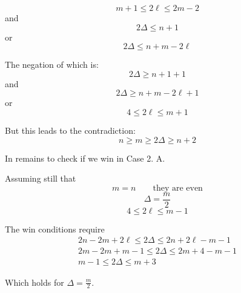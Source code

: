 \[ m+1 \leq 2 \ell \leq 2m -2 \]
and
\[2 \Delta \leq n +1 \]
or
\[2\Delta \leq n + m - 2 \ell \]

The negation of which is:
\[2 \Delta \geq n +1 +1 \]
and
\[2\Delta \geq n + m - 2 \ell + 1\]
or
\[4 \leq 2 \ell \leq m +1 \]

But this leads to the contradiction:
\[ n \geq m \geq 2 \Delta \geq n +2 \]

In remains to check if we win in Case 2. A.

Assuming still that
\[ m = n \qquad \text{they are even} \]
\[ \Delta = \frac{m}{2} \]
\[ 4 \leq 2 \ell \leq m -1 \]

The win conditions require
\begin{align*}
2n - 2m + 2\ell \leq 2 \Delta \leq 2n + 2\ell -m -1 \\
2m - 2m + m - 1 \leq 2 \Delta \leq 2m + 4 - m - 1 \\
m - 1 \leq 2 \Delta \leq m + 3
\end{align*}

Which holds for $\Delta = \frac{m}{2}$.
